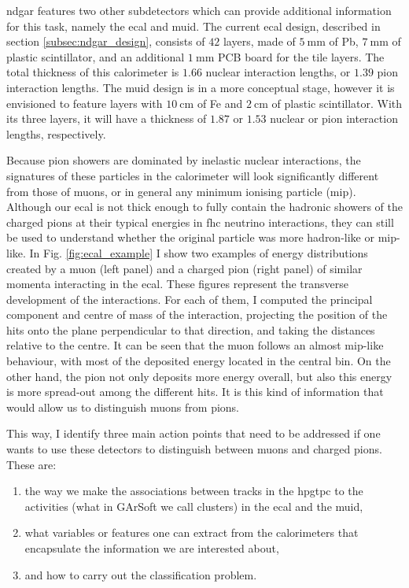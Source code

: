 \gls{ndgar} features two other subdetectors which can provide additional information for this task, namely the \gls{ecal} and \gls{muid}. The current \gls{ecal} design, described in section \ref{subsec:ndgar_design}, consists of $42$ layers, made of $5~\mathrm{mm}$ of Pb, $7~\mathrm{mm}$ of plastic scintillator, and an additional $1~\mathrm{mm}$ PCB board for the tile layers. The total thickness of this calorimeter is $1.66$ nuclear interaction lengths, or $1.39$ pion interaction lengths. The \gls{muid} design is in a more conceptual stage, however it is envisioned to feature layers with $10~\mathrm{cm}$ of Fe and $2~\mathrm{cm}$ of plastic scintillator. With its three layers, it will have a thickness of $1.87$ or $1.53$ nuclear or pion interaction lengths, respectively.

Because pion showers are dominated by inelastic nuclear interactions, the signatures of these particles in the calorimeter will look significantly different from those of muons, or in general any minimum ionising particle (\gls{mip}). Although our \gls{ecal} is not thick enough to fully contain the hadronic showers of the charged pions at their typical energies in \gls{fhc} neutrino interactions, they can still be used to understand whether the original particle was more hadron-like or \gls{mip}-like. In Fig. \ref{fig:ecal_example} I show two examples of energy distributions created by a muon (left panel) and a charged pion (right panel) of similar momenta interacting in the \gls{ecal}. These figures represent the transverse development of the interactions. For each of them, I computed the principal component and centre of mass of the interaction, projecting the position of the hits onto the plane perpendicular to that direction, and taking the distances relative to the centre. It can be seen that the muon follows an almost \gls{mip}-like behaviour, with most of the deposited energy located in the central bin. On the other hand, the pion not only deposits more energy overall, but also this energy is more spread-out among the different hits. It is this kind of information that would allow us to distinguish muons from pions.

This way, I identify three main action points that need to be addressed if one wants to use these detectors to distinguish between muons and charged pions. These are:
\begin{enumerate}
	\item the way we make the associations between tracks in the \gls{hpgtpc} to the activities (what in GArSoft we call clusters) in the \gls{ecal} and the \gls{muid},
	\item what variables or features one can extract from the calorimeters that encapsulate the information we are interested about,
	\item and how to carry out the classification problem.
\end{enumerate}

